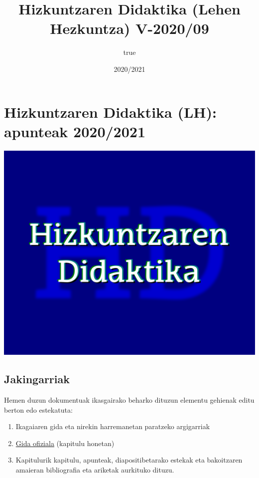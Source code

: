 \documentclass[
]{book}
\title{Hizkuntzaren Didaktika (Lehen Hezkuntza) V-2020/09}
\author{true}
\date{2020/2021}
\providecommand{\tightlist}{%
  \setlength{\itemsep}{0pt}\setlength{\parskip}{0pt}}
\begin{document}
\maketitle

{
\setcounter{tocdepth}{1}
\tableofcontents
}
\hypertarget{hizkuntzaren-didaktika-lh-apunteak-20202021}{%
\chapter*{Hizkuntzaren Didaktika (LH): apunteak 2020/2021}\label{hizkuntzaren-didaktika-lh-apunteak-20202021}}

\includegraphics{assets/azala.png}

\hypertarget{jakingarriak}{%
\section*{Jakingarriak}\label{jakingarriak}}

Hemen duzun dokumentuak ikasgairako beharko dituzun elementu gehienak editu berton edo estekatuta:

\begin{enumerate}
\def\labelenumi{\arabic{enumi}.}
\tightlist
\item
  Ikagaiaren gida eta nirekin harremanetan paratzeko argigarriak
\item
  \href{https://www.ehu.eus/eu/web/hld-dll/ikasgaiak?p_redirect=consultaAsignatura\&p_anyo_acad=20200\&p_ciclo=X\&p_curso=3\&p_cod_asignatura=25868\&p_cod_plan=GPRIMA30\&p_cod_centro=354}{Gida ofiziala} (kapitulu honetan)
\item
  Kapitulurik kapitulu, apunteak, diapositibetarako estekak eta bakoitzaren amaieran bibliografia eta ariketak aurkituko dituzu.
\end{enumerate}
\end{document}
